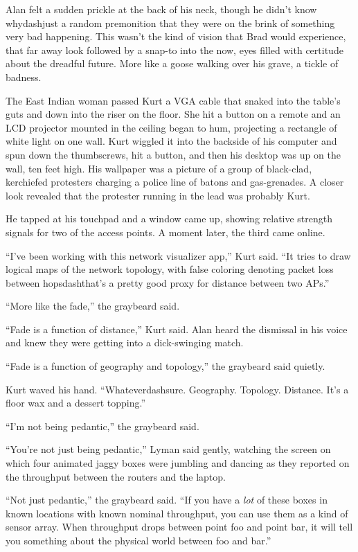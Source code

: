 Alan felt a sudden prickle at the back of his neck, though he didn't
know whydash{}just a random premonition that they were on the brink of
something very bad happening.  This wasn't the kind of vision that
Brad would experience, that far away look followed by a snap-to into
the now, eyes filled with certitude about the dreadful future.  More
like a goose walking over his grave, a tickle of badness.

The East Indian woman passed Kurt a VGA cable that snaked into the
table's guts and down into the riser on the floor.  She hit a button
on a remote and an LCD projector mounted in the ceiling began to hum,
projecting a rectangle of white light on one wall.  Kurt wiggled it
into the backside of his computer and spun down the thumbscrews, hit a
button, and then his desktop was up on the wall, ten feet high.  His
wallpaper was a picture of a group of black-clad, kerchiefed
protesters charging a police line of batons and gas-grenades.  A
closer look revealed that the protester running in the lead was
probably Kurt.

He tapped at his touchpad and a window came up, showing relative
strength signals for two of the access points.  A moment later, the
third came online.

``I've been working with this network visualizer app,'' Kurt said. 
``It tries to draw logical maps of the network topology, with false
coloring denoting packet loss between hopsdash{}that's a pretty good
proxy for distance between two APs.''

``More like the fade,'' the graybeard said.

``Fade is a function of distance,'' Kurt said.  Alan heard the
dismissal in his voice and knew they were getting into a dick-swinging
match.

``Fade is a function of geography and topology,'' the graybeard said
quietly.

Kurt waved his hand.  ``Whateverdash{}sure.  Geography.  Topology. 
Distance.  It's a floor wax and a dessert topping.''

``I'm not being pedantic,'' the graybeard said.

``You're not just being pedantic,'' Lyman said gently, watching the
screen on which four animated jaggy boxes were jumbling and dancing as
they reported on the throughput between the routers and the laptop.

``Not just pedantic,'' the graybeard said.  ``If you have a
\textit{lot} of these boxes in known locations with known nominal
throughput, you can use them as a kind of sensor array.  When
throughput drops between point foo and point bar, it will tell you
something about the physical world between foo and bar.''

